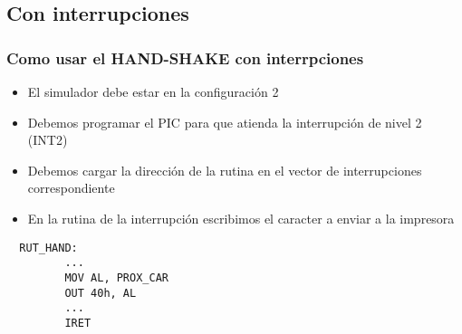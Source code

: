 \documentclass{beamer}
\begin{document}
\subsection{Con interrupciones}
\begin{frame}[fragile]
\frametitle{Como usar el HAND-SHAKE con interrpciones}
\begin{itemize}
 \item El simulador debe estar en la configuración 2
 \item Debemos programar el PIC para que atienda la interrupción de nivel 2 (INT2)
 \item Debemos cargar la dirección de la rutina en el vector de interrupciones correspondiente
 \item En la rutina de la interrupción escribimos el caracter a enviar a la impresora
\end{itemize}

\begin{block}{}
 \begin{verbatim}
  RUT_HAND:
         ...
         MOV AL, PROX_CAR
         OUT 40h, AL
         ...
         IRET
 \end{verbatim}
\end{block}

\end{frame}
\end{document}
